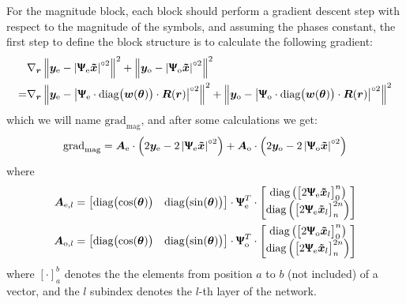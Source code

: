 For the magnitude block, each block should perform a gradient descent step with respect to the magnitude of the symbols, and assuming the phases constant, the first step to define the block structure is to calculate the following gradient:
 \begin{align}
	&\nabla_{\bm r}\left\lVert \bm y_\text{e} - \left|\bm{\Uppsi_\text{e}\tilde{x} } \right|^{\circ2}\right\rVert^2+\left\lVert \bm y_\text{o} - \left|\bm{\Uppsi_\text{o}\tilde{x} } \right|^{\circ2}\right\rVert^2\\
	=&\nabla_{\bm r}\left\lVert \bm y_\text{e} - \left|\bm{\Uppsi}_\text{e}\cdot\text{diag}\bigl(\bm w(\bm\theta)\bigr)\cdot\bm R(\bm r)  \right|^{\circ2}\right\rVert^2+\left\lVert \bm y_\text{o} - \left|\bm{\Uppsi}_\text{o}\cdot\text{diag}\bigl(\bm w(\bm\theta)\bigr)\cdot\bm R(\bm r)  \right|^{\circ2}\right\rVert^2
\end{align}
which we will name $\text{grad}_\text{mag}$, and after some calculations we get:
\begin{equation}
\text{grad}_\text{mag}=\bm A_\text{e}\cdot\left(2\bm y_\text{e} - 2\left|\bm{\Uppsi}_\text{e}\bm{\tilde{x}}\right|^{\circ2}\right)+
\bm A_\text{o}\cdot\left(2\bm y_\text{o} - 2\left|\bm{\Uppsi}_\text{o}\bm{\tilde{x}}\right|^{\circ2}\right)
\label{eq:grad_mag}
\end{equation}
where
\begin{align}
\bm A_{\text{e},l}&=\begin{bmatrix}\text{diag}\bigl(\cos(\bm\theta)\bigr)&\text{diag}\bigl(\sin(\bm\theta)\bigr)\end{bmatrix}\cdot\bm\Uppsi_\text{e}^T\cdot\begin{bmatrix}\text{diag}\left(\bigl[2\bm{\Uppsi}_\text{e}\bm{\tilde{x}}_l\bigr]_0^n\right)\\\text{diag}\left(\bigl[2\bm{\Uppsi}_\text{e}\bm{\tilde{x}}_l \bigr]_{n}^{2n}\right)\end{bmatrix}\\
\bm A_{\text{o},l}&=\begin{bmatrix}\text{diag}\bigl(\cos(\bm\theta)\bigr)&\text{diag}\bigl(\sin(\bm\theta)\bigr)\end{bmatrix}\cdot\bm\Uppsi_\text{o}^T\cdot\begin{bmatrix}\text{diag}\left(\bigl[2\bm{\Uppsi}_\text{o}\bm{\tilde{x}}_l\bigr]_0^n\right)\\\text{diag}\left(\bigl[2\bm{\Uppsi}_\text{e}\bm{\tilde{x}}_l\bigr]_{n}^{2n}\right)\end{bmatrix}
\end{align}
where $[\cdot]_a^b$ denotes the the elements from position $a$ to $b$ (not included) of a vector, and the $l$ subindex denotes the $l$-th layer of the network.

